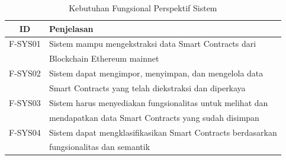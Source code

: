 \begin{table}[ht]
	\caption{Kebutuhan Fungsional Perspektif Sistem}
	\vspace{0.25cm}
	\begin{center}
		\begin{tabular}{|c|l|}
			\hline
			\textbf{ID} & \textbf{Penjelasan}                                         \\ \hline
			F-SYS01     & Sistem mampu mengekstraksi data Smart Contracts dari        \\ & Blockchain Ethereum mainnet \\ \hline
			F-SYS02     & Sistem dapat mengimpor, menyimpan, dan mengelola data       \\ & Smart Contracts yang telah diekstraksi dan diperkaya  \\ \hline
			F-SYS03     & Sistem harus menyediakan fungsionalitas untuk melihat dan   \\ & mendapatkan data Smart Contracts yang sudah disimpan  \\ \hline
			F-SYS04     & Sistem dapat mengklasifikasikan Smart Contracts berdasarkan \\ & fungsionalitas dan semantik \\ \hline
		\end{tabular}
	\end{center}
\end{table}



